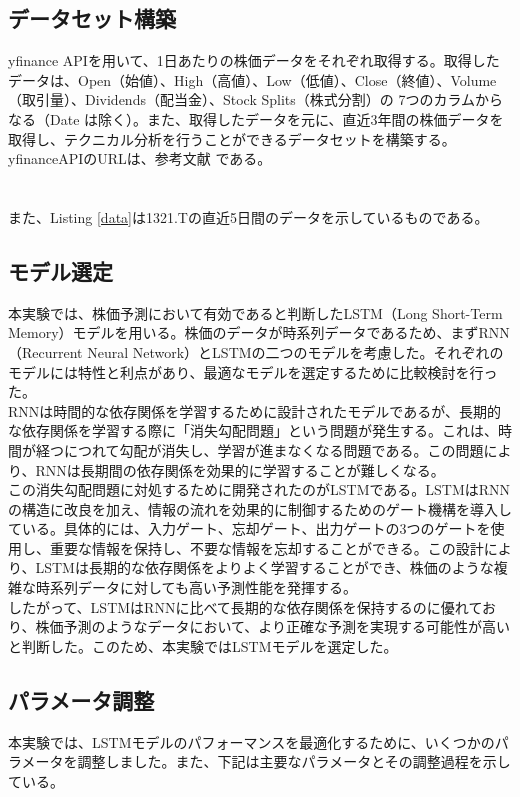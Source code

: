 \documentclass[a4paper, 11pt, titlepage]{jsarticle}
\begin{document}
\subsection{データセット構築}
\indent yfinance APIを用いて、1日あたりの株価データをそれぞれ取得する。取得したデータは、Open（始値）、High（高値）、Low（低値）、Close（終値）、Volume（取引量）、Dividends（配当金）、Stock Splits（株式分割）の 7つのカラムからなる（Date は除く）。また、取得したデータを元に、直近3年間の株価データを取得し、テクニカル分析を行うことができるデータセットを構築する。yfinanceAPIのURLは、参考文献 \cite{yfin}である。\\\\\\
\indent また、Listing \ref{data}は1321.Tの直近5日間のデータを示しているものである。

\subsection{モデル選定}
\indent 本実験では、株価予測において有効であると判断したLSTM（Long Short-Term Memory）モデルを用いる。株価のデータが時系列データであるため、まずRNN（Recurrent Neural Network）とLSTMの二つのモデルを考慮した。それぞれのモデルには特性と利点があり、最適なモデルを選定するために比較検討を行った。\\
\indent RNNは時間的な依存関係を学習するために設計されたモデルであるが、長期的な依存関係を学習する際に「消失勾配問題」という問題が発生する。これは、時間が経つにつれて勾配が消失し、学習が進まなくなる問題である。この問題により、RNNは長期間の依存関係を効果的に学習することが難しくなる。\\
\indent この消失勾配問題に対処するために開発されたのがLSTMである。LSTMはRNNの構造に改良を加え、情報の流れを効果的に制御するためのゲート機構を導入している。具体的には、入力ゲート、忘却ゲート、出力ゲートの3つのゲートを使用し、重要な情報を保持し、不要な情報を忘却することができる。この設計により、LSTMは長期的な依存関係をよりよく学習することができ、株価のような複雑な時系列データに対しても高い予測性能を発揮する。\\
\indent したがって、LSTMはRNNに比べて長期的な依存関係を保持するのに優れており、株価予測のようなデータにおいて、より正確な予測を実現する可能性が高いと判断した。このため、本実験ではLSTMモデルを選定した。

\subsection{パラメータ調整}
\indent 本実験では、LSTMモデルのパフォーマンスを最適化するために、いくつかのパラメータを調整しました。また、下記は主要なパラメータとその調整過程を示している。
\end{document}

